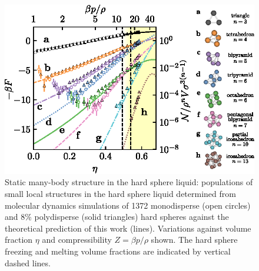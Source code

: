 \documentclass[11pt,twoside]{report}
\begin{document}
\begin{figure}
  \includegraphics[width=\linewidth,center]{structure-populations}
  \caption[Concentration of local structures in the equilibrium liquid]{
    Static many-body structure in the hard sphere liquid: populations of small local structures in the hard sphere liquid determined from molecular dynamics simulations of 1372 monodisperse (open circles) and 8\% polydisperse (solid triangles) hard spheres against the theoretical prediction of this work (lines).
    Variations against volume fraction $\eta$ and compressibility $Z = \beta p/\rho$ shown.
    The hard sphere freezing and melting volume fractions are indicated by vertical dashed lines.
  }
  \label{fig:structure-populations}
\end{figure}
\end{document}
